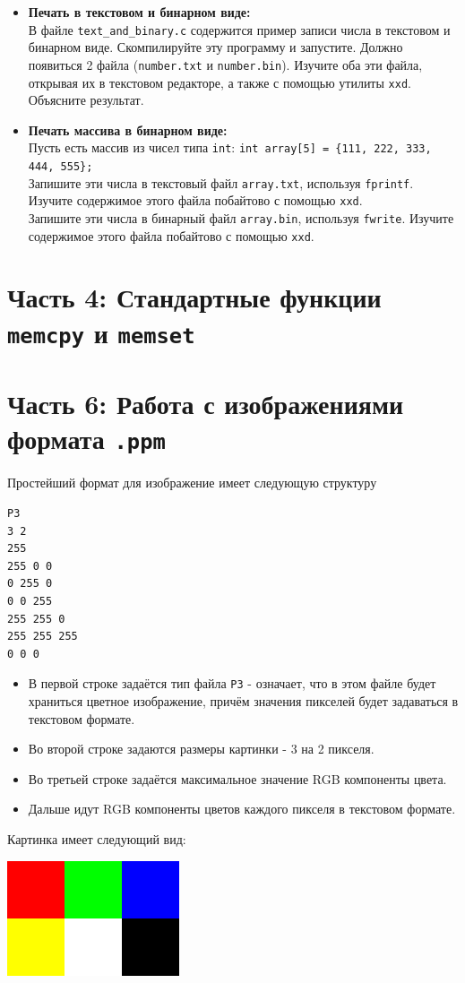 \documentclass{article}
\begin{document}
\begin{itemize}
\item \textbf{Печать в текстовом и бинарном виде:}\\
В файле \texttt{text\_and\_binary.c} содержится пример записи числа в текстовом и бинарном виде. Скомпилируйте эту программу и запустите. Должно появиться 2 файла (\texttt{number.txt} и \texttt{number.bin}). Изучите оба эти файла, открывая их в текстовом редакторе, а также с помощью утилиты \texttt{xxd}. Объясните результат.


\item \textbf{Печать массива в бинарном виде:}\\
Пусть есть массив из чисел типа \texttt{int}: \texttt{int array[5] = \{111, 222, 333, 444, 555\};}\\
Запишите эти числа в текстовый файл \texttt{array.txt}, используя \texttt{fprintf}. Изучите содержимое этого файла побайтово с помощью \texttt{xxd}.\\
Запишите эти числа в бинарный файл \texttt{array.bin}, используя \texttt{fwrite}. Изучите содержимое этого файла побайтово с помощью \texttt{xxd}.
\end{itemize}





\section*{Часть 4: Стандартные функции \texttt{memcpy} и \texttt{memset}}


\newpage
\section*{Часть 6: Работа с изображениями формата \texttt{.ppm}}
Простейший формат для изображение имеет следующую структуру
\begin{verbatim}
P3
3 2
255
255 0 0 
0 255 0  
0 0 255 
255 255 0 
255 255 255 
0 0 0
\end{verbatim}
\begin{itemize}
\item В первой строке задаётся тип файла \texttt{P3} - означает, что в этом файле будет храниться цветное изображение, причём значения пикселей будет задаваться в текстовом формате.
\item Во второй строке задаются размеры картинки - 3 на 2 пикселя.
\item Во третьей строке задаётся максимальное значение RGB компоненты цвета.
\item Дальше идут RGB компоненты цветов каждого пикселя в текстовом формате.
\end{itemize}
Картинка имеет следующий вид:
\begin{center}
\includegraphics[scale=0.5]{../images/tiny.png}
\end{center}
\end{document}
